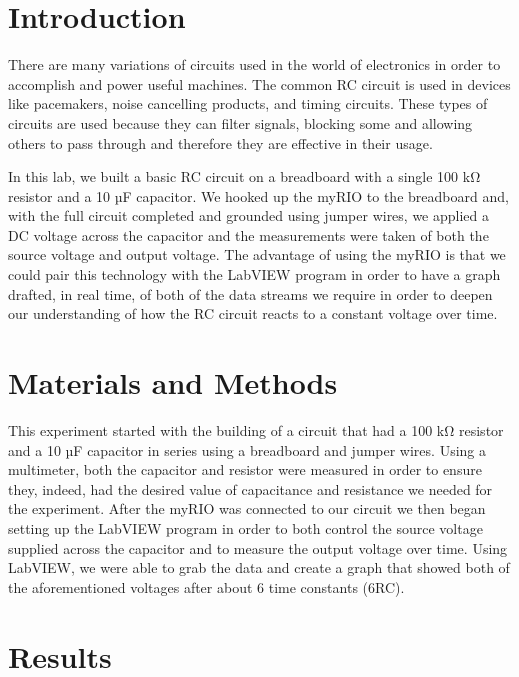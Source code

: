 \documentclass[10pt,twocolumn]{article}
\begin{document}

\section{Introduction} 
\label{sec:introduction}

There are many variations of circuits used in the world of electronics in order to accomplish and power useful machines. The common RC circuit is used in devices like pacemakers, noise cancelling products, and timing circuits. These types of circuits are used because they can filter signals, blocking some and allowing others to pass through and therefore they are effective in their usage. 

In this lab, we built a basic RC circuit on a breadboard with a single 100 kΩ resistor and a 10 µF capacitor. We hooked up the myRIO to the breadboard and, with the full circuit completed and grounded using jumper wires, we applied a DC voltage across the capacitor and the measurements were taken of both the source voltage and output voltage.  The advantage of using the myRIO is that we could pair this technology with the LabVIEW program in order to have a graph drafted, in real time, of both of the data streams we require in order to deepen our understanding of how the RC circuit reacts to a constant voltage over time. 





\section{Materials and Methods}

This experiment started with the building of a circuit that had a 100 kΩ resistor and a 10 µF capacitor in series using a breadboard and jumper wires. Using a multimeter, both the capacitor and resistor were measured in order to ensure they, indeed, had the desired value of capacitance and resistance we needed for the experiment. After the myRIO was connected to our circuit we then began setting up the LabVIEW program in order to both control the source voltage supplied across the capacitor and to measure the output voltage over time. Using LabVIEW, we were able to grab the data and create a graph that showed both of the aforementioned voltages after about 6 time constants (6RC).
\section{Results}
\label{sec:results}
\end{document}
